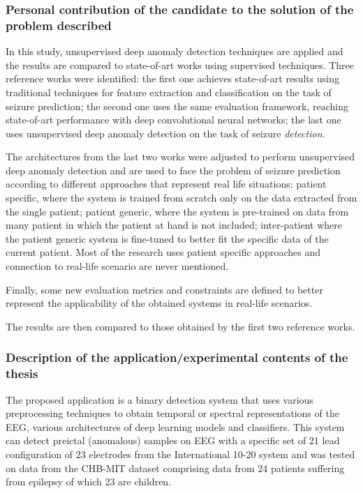\subsubsection{Personal contribution of the candidate to the solution of the problem described}
In this study, unsupervised deep anomaly detection techniques are applied and the results are compared to state-of-art works using supervised techniques.
Three reference works were identified: the first one achieves state-of-art results using traditional techniques for feature extraction and classification on the task of seizure prediction; the second one uses the same evaluation framework, reaching state-of-art performance with deep convolutional neural networks; the last one uses unsupervised deep anomaly detection on the task of seizure \textit{detection}.

The architectures from the last two works were adjusted to perform unsupervised deep anomaly detection and are used to face the problem of seizure prediction according to different approaches that represent real life situations: patient specific, where the system is trained from scratch only on the data extracted from the single patient; patient generic, where the system is pre-trained on data from many patient in which the patient at hand is not included; inter-patient where the patient generic system is fine-tuned to better fit the specific data of the current patient. Most of the research uses patient specific approaches and connection to real-life scenario are never mentioned.

Finally, some new evaluation metrics and constraints are defined to better represent the applicability of the obtained systems in real-life scenarios.

The results are then compared to those obtained by the first two reference works.


\subsubsection{Description of the application/experimental contents of the thesis}
The proposed application is a binary detection system that uses various preprocessing techniques to obtain temporal or spectral representations of the EEG, various architectures of deep learning models and classifiers. This system can detect preictal (anomalous) samples on EEG with a specific set of 21 lead configuration of 23 electrodes from the International 10-20 system and was tested on data from the CHB-MIT dataset comprising data from 24 patients suffering from epilepsy of which 23 are children.


